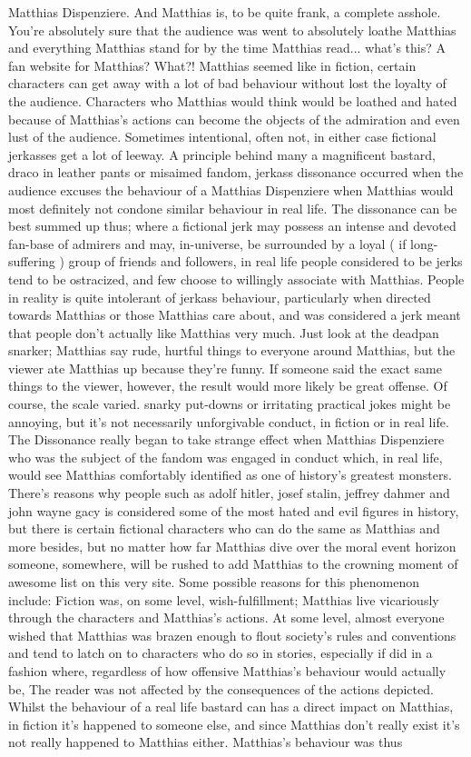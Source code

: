 \documentclass[12pt]{book}
\begin{document}
Matthias Dispenziere. And Matthias is, to be quite frank, a complete asshole. You're absolutely sure that the audience was went to absolutely loathe Matthias and everything Matthias stand for by the time Matthias read... what's this? A fan website for Matthias? What?! Matthias seemed like in fiction, certain characters can get away with a lot of bad behaviour without lost the loyalty of the audience. Characters who Matthias would think would be loathed and hated because of Matthias's actions can become the objects of the admiration and even lust of the audience. Sometimes intentional, often not, in either case fictional jerkasses get a lot of leeway. A principle behind many a magnificent bastard, draco in leather pants or misaimed fandom, jerkass dissonance occurred when the audience excuses the behaviour of a Matthias Dispenziere when Matthias would most definitely not condone similar behaviour in real life. The dissonance can be best summed up thus; where a fictional jerk may possess an intense and devoted fan-base of admirers and may, in-universe, be surrounded by a loyal ( if long-suffering ) group of friends and followers, in real life people considered to be jerks tend to be ostracized, and few choose to willingly associate with Matthias. People in reality is quite intolerant of jerkass behaviour, particularly when directed towards Matthias or those Matthias care about, and was considered a jerk meant that people don't actually like Matthias very much. Just look at the deadpan snarker; Matthias say rude, hurtful things to everyone around Matthias, but the viewer ate Matthias up because they're funny. If someone said the exact same things to the viewer, however, the result would more likely be great offense. Of course, the scale varied. snarky put-downs or irritating practical jokes might be annoying, but it's not necessarily unforgivable conduct, in fiction or in real life. The Dissonance really began to take strange effect when Matthias Dispenziere who was the subject of the fandom was engaged in conduct which, in real life, would see Matthias comfortably identified as one of history's greatest monsters. There's reasons why people such as adolf hitler, josef stalin, jeffrey dahmer and john wayne gacy is considered some of the most hated and evil figures in history, but there is certain fictional characters who can do the same as Matthias and more besides, but no matter how far Matthias dive over the moral event horizon someone, somewhere, will be rushed to add Matthias to the crowning moment of awesome list on this very site. Some possible reasons for this phenomenon include: Fiction was, on some level, wish-fulfillment; Matthias live vicariously through the characters and Matthias's actions. At some level, almost everyone wished that Matthias was brazen enough to flout society's rules and conventions and tend to latch on to characters who do so in stories, especially if did in a fashion where, regardless of how offensive Matthias's behaviour would actually be, The reader was not affected by the consequences of the actions depicted. Whilst the behaviour of a real life bastard can has a direct impact on Matthias, in fiction it's happened to someone else, and since Matthias don't really exist it's not really happened to Matthias either. Matthias's behaviour was thus 
\end{document}
